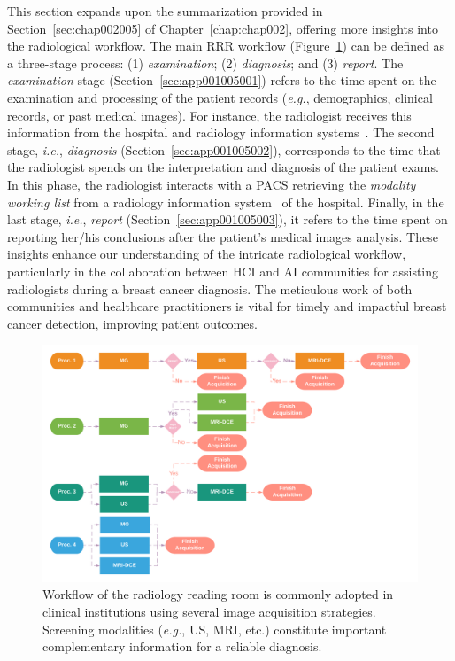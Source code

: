This section expands upon the summarization provided in Section~\ref{sec:chap002005} of Chapter~\ref{chap:chap002}, offering more insights into the radiological workflow.
The main \ac{RRR} workflow (Figure~\ref{fig:fig018}) can be defined as a three-stage process:
(1) {\it examination};
(2) {\it diagnosis}; and
(3) {\it report}.
The {\it examination} stage (Section~\ref{sec:app001005001}) refers to the time spent on the examination and processing of the patient records ({\it e.g.}, demographics, clinical records, or past medical images).
For instance, the radiologist receives this information from the hospital and radiology information systems~\cite{islam2018recent}.
The second stage, {\it i.e.}, {\it diagnosis} (Section~\ref{sec:app001005002}), corresponds to the time that the radiologist spends on the interpretation and diagnosis of the patient exams.
In this phase, the radiologist interacts with a \ac{PACS} retrieving the {\it modality working list} from a radiology information system~\cite{DIROBERTO2016950} of the hospital.
Finally, in the last stage, {\it i.e.}, {\it report} (Section~\ref{sec:app001005003}), it refers to the time spent on reporting her/his conclusions after the patient's medical images analysis.
These insights enhance our understanding of the intricate radiological workflow, particularly in the collaboration between \ac{HCI} and \ac{AI} communities for assisting radiologists during a breast cancer diagnosis.
The meticulous work of both communities and healthcare practitioners is vital for timely and impactful breast cancer detection, improving patient outcomes.

\begin{figure}[ht]
\centering
\includegraphics[width=\columnwidth]{images/fig018}
\caption{Workflow of the radiology reading room is commonly adopted in clinical institutions using several image acquisition strategies. Screening modalities ({\it e.g.}, US, MRI, etc.) constitute important complementary information for a reliable diagnosis.}
\label{fig:fig018}
\end{figure}

